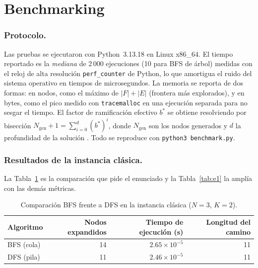 \documentclass[runningheads]{llncs}
\begin{document}
\section{Benchmarking}\label{sec:experimentos}

\subsubsection{Protocolo.}
Las pruebas se ejecutaron con Python~3.13.18 en Linux x86\_64. El tiempo
reportado es la \emph{mediana} de 2\,000 ejecuciones (10 para BFS de árbol)
medidas con el reloj de alta resolución \texttt{perf\_counter} de Python, lo que amortigua el ruido
del sistema operativo en tiempos de microsegundos. La memoria se reporta de dos
formas: en nodos, como el máximo de $|F|+|E|$ (frontera más explorados), y en
bytes, como el pico medido con \texttt{tracemalloc} en una ejecución separada
para no sesgar el tiempo. El factor de ramificación efectivo $b^*$ se obtiene
resolviendo por bisección $N_{\text{gen}}+1 = \sum_{i=0}^{d} (b^*)^i$, donde
$N_{\text{gen}}$ son los nodos generados y $d$ la profundidad de la solución
\cite{russell2020}. Todo se reproduce con \texttt{python3 benchmark.py}.

\subsubsection{Resultados de la instancia clásica.}
La Tabla~\ref{tab:principal} es la comparación que pide el enunciado y la
Tabla~\ref{tab:e1} la amplía con las demás métricas.

\begin{table}[t]
\centering
\caption{Comparación BFS frente a DFS en la instancia clásica ($N=3$, $K=2$).}
\label{tab:principal}
\setlength{\tabcolsep}{8pt}
\begin{tabular}{@{}lrrr@{}}
\toprule
Algoritmo & Nodos expandidos & Tiempo de ejecución (s) & Longitud del camino \\
\midrule
BFS (cola) & 14 & $2.65\times10^{-5}$ & 11 \\
DFS (pila) & 11 & $2.46\times10^{-5}$ & 11 \\
\bottomrule
\end{tabular}
\end{table}
\end{document}
